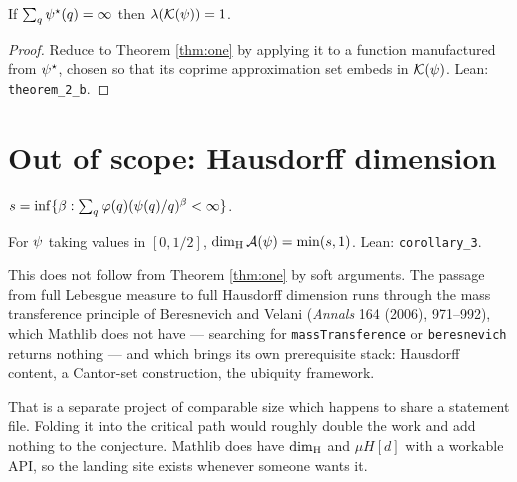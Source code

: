 \begin{theorem}
  \label{thm:two-b}
  \notready
  If $\sum_q \psi^{\star}(q) = \infty$ then $\lambda(\mathcal{K}(\psi)) = 1$.
\end{theorem}

\begin{proof}
  Reduce to Theorem \ref{thm:one} by applying it to a function manufactured from
  $\psi^{\star}$, chosen so that its coprime approximation set embeds in $\mathcal{K}(\psi)$.
  Lean: \texttt{theorem\_2\_b}.
\end{proof}

\chapter{Out of scope: Hausdorff dimension}
\label{chap:hausdorff}

\begin{definition}
  \label{def:critexp}
  \leanok
  $s = \inf \{ \beta : \sum_q \varphi(q)(\psi(q)/q)^{\beta} < \infty \}$.
\end{definition}

\begin{corollary}
  \label{cor:three}
  \notready
  For $\psi$ taking values in $[0,1/2]$, $\dim_{\mathrm H} \mathcal{A}(\psi) = \min(s,1)$.
  Lean: \texttt{corollary\_3}.
\end{corollary}

This does not follow from Theorem \ref{thm:one} by soft arguments. The passage from
full Lebesgue measure to full Hausdorff dimension runs through the mass transference
principle of Beresnevich and Velani (\emph{Annals} 164 (2006), 971--992), which
Mathlib does not have --- searching for \texttt{massTransference} or
\texttt{beresnevich} returns nothing --- and which brings its own prerequisite stack:
Hausdorff content, a Cantor-set construction, the ubiquity framework.

That is a separate project of comparable size which happens to share a statement file.
Folding it into the critical path would roughly double the work and add nothing to the
conjecture. Mathlib does have $\dim_{\mathrm H}$ and $\mu H[d]$ with a workable API, so the
landing site exists whenever someone wants it.
